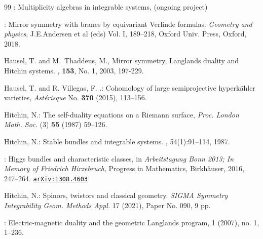 \documentclass[12pt]{article}
\numberwithin{equation}{section}
\theoremstyle{remark}
\numberwithin{theorem}{section}
\numberwithin{equation}{section}
\begin{document}
\begin{thebibliography}{99}
	: Multiplicity algebras in integrable systems, (ongoing project)
	
	:
	Mirror symmetry with branes by equivariant Verlinde formulas. {\em Geometry and physics}, J.E.Andersen et al (eds) Vol. I, 189--218,  Oxford Univ. Press, Oxford, 2018.
	
	 { Hausel, T. {\rm and} M.~Thaddeus, M.},
	\newblock Mirror symmetry, {L}anglands duality and {H}itchin systems.
	, {\bf 153}, No. 1, 2003, 197-229. %
	
	 { Hausel,  T. {\rm and}  R. Villegas, F. .}:
	Cohomology of large semiprojective hyperk\"ahler varieties, 
	{\em Ast\'erisque} No. {\bf 370} (2015), 113--156. %
	
	 {   Hitchin, N.}: { The self-duality equations on a Riemann 
		surface}, {\em Proc. London Math. Soc.} (3) {\bf 55} (1987) 59--126.
	
	
	
	{ Hitchin, N.}:
	\newblock Stable bundles and integrable systems.
	, 54(1):91--114, 1987.
	
	: Higgs bundles and characteristic classes, in {
		\em Arbeitstagung Bonn 2013; In Memory of Friedrich Hirzebruch}, Progress in Mathematics, Birkh\"auser, 2016, 247--264. \href{https://arxiv.org/abs/1308.4603}{\tt arXiv:1308.4603}
	
	 Hitchin, N.:
Spinors, twistors and classical geometry. 
{\em SIGMA Symmetry Integrability Geom. Methods Appl.} 17 (2021), Paper No. 090, 9 pp.
	
	
	:
	\newblock Electric-magnetic duality and the geometric {L}anglands program,   1  (2007),  no. 1, 1--236. 
	
	

\end{thebibliography}
\end{document}
